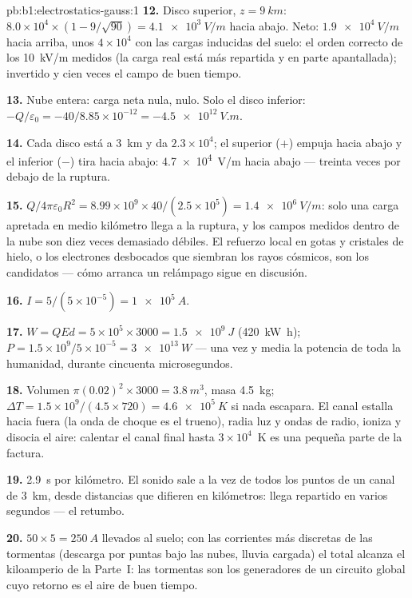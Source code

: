 \begin{solution}{pb:b1:electrostatics-gauss:1}
\textbf{12.} Disco superior, $z = \qty{9}{km}$: $8.0 \times 10^4 \times (1 - 9/\sqrt{90}) =
\qty{4.1e3}{V/m}$ hacia abajo. Neto: $\qty{1.9e4}{V/m}$ hacia arriba, unos $4 \times 10^4$
con las cargas inducidas del suelo: el orden correcto de los \qty{10}{kV/m}
medidos (la carga real está más repartida y en parte apantallada);
invertido y cien veces el campo de buen tiempo.

\textbf{13.} Nube entera: carga neta nula,  nulo. Solo el disco inferior:
$-Q/\varepsilon_0 = -40/8.85 \times 10^{-12} = \qty{-4.5e12}{V.m}$.

\textbf{14.} Cada disco está a \qty{3}{km} y da $2.3 \times 10^4$; el
superior ($+$) empuja hacia abajo y el inferior ($-$) tira hacia abajo:
\qty{4.7e4}{V/m} hacia abajo --- treinta veces por debajo de la ruptura.

\textbf{15.} $Q/4\pi\varepsilon_0R^2 = 8.99 \times 10^9 \times 40/(2.5 \times 10^5) =
\qty{1.4e6}{V/m}$: solo una carga apretada en medio kilómetro llega a la
ruptura, y los campos medidos dentro de la nube son diez veces demasiado
débiles. El refuerzo local en gotas y cristales de hielo, o los electrones
desbocados que siembran los rayos cósmicos, son los candidatos --- cómo
arranca un relámpago sigue en discusión.

\textbf{16.} $I = 5/(5 \times 10^{-5}) = \qty{1e5}{A}$.

\textbf{17.} $W = QEd = 5 \times 10^5 \times 3000 = \qty{1.5e9}{J}$ (\qty{420}{kW h});
$P = 1.5 \times 10^9/5 \times 10^{-5} = \qty{3e13}{W}$ --- una vez y media
la potencia de toda la humanidad, durante cincuenta microsegundos.

\textbf{18.} Volumen $\pi(0.02)^2 \times 3000 = \qty{3.8}{m^3}$, masa \qty{4.5}{kg};
$\Delta T = 1.5 \times 10^9/(4.5 \times 720) = \qty{4.6e5}{K}$ si nada escapara.
El canal estalla hacia fuera (la onda de choque es el trueno), radia luz
y ondas de radio, ioniza y disocia el aire: calentar el canal final hasta
$3 \times 10^4$~K es una pequeña parte de la factura.

\textbf{19.} \qty{2.9}{s} por kilómetro. El sonido sale a la vez de todos
los puntos de un canal de \qty{3}{km}, desde distancias que difieren en
kilómetros: llega repartido en varios segundos --- el retumbo.

\textbf{20.} $50 \times 5 = \qty{250}{A}$ llevados al suelo; con las
corrientes más discretas de las tormentas (descarga por puntas bajo las
nubes, lluvia cargada) el total alcanza el kiloamperio de la Parte~I: las
tormentas son los generadores de un circuito global cuyo retorno es el aire de buen tiempo.


\end{solution}
